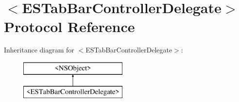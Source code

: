 \hypertarget{protocol_e_s_tab_bar_controller_delegate-p}{}\section{$<$E\+S\+Tab\+Bar\+Controller\+Delegate$>$ Protocol Reference}
\label{protocol_e_s_tab_bar_controller_delegate-p}
Inheritance diagram for $<$E\+S\+Tab\+Bar\+Controller\+Delegate$>$\+:\begin{figure}[H]
\begin{center}
\leavevmode
\includegraphics[height=2.000000cm]{protocol_e_s_tab_bar_controller_delegate-p}
\end{center}
\end{figure}
